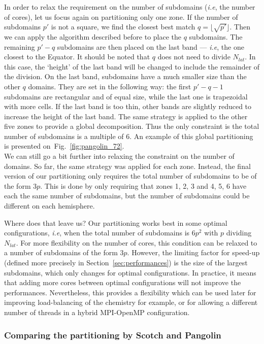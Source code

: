 In order to relax the requirement on the number of subdomains (\textit{i.e}, the
number of cores), let us focus again on partitioning only one zone. If the
number of subdomains $p'$ is not a square, we find the closest best match
$q=\lfloor \sqrt{p'}\rfloor$. Then we can apply the algorithm described before
to place the $q$ subdomains. The remaining $p'-q$ subdomains are then placed on the
last band --- \textit{i.e}, the one closest to the Equator. It should be noted
that $q$ does not need to divide $N_{lat}$. In this case, the `height' of
the last band will be changed to include the remainder of the division.  On the
last band, subdomains have a much smaller size than the other $q$
domains. They are set in the following way: the first $p'-q-1$ subdomains
are rectangular and of equal size, while the last one is trapezoidal with more
cells. If the last band is too thin, other bands are slightly reduced to
increase the height of the last band. The same strategy is applied to the other
five zones to provide a global decomposition. Thus the only constraint is the
total number of subdomains is a multiple of $6$. An example of this global
partitioning is presented on~Fig.~\ref{fig:pangolin_72}.\\
We can still go a bit further into relaxing the constraint on the number of
domains. So far, the same strategy was applied for each zone. Instead, the final
version of our partitioning only requires the total number of subdomains to be of
the form $3p$. This is done by only requiring that zones 1, 2, 3 and 4, 5, 6 have
each the same number of subdomains, but the number of subdomains could be different on
each hemisphere.

Where does that leave us? Our partitioning works best in some optimal
configurations, \textit{i.e}, when the total number of subdomains is $6p^2$ with
$p$ dividing $N_{lat}$. For more flexibility on the number of cores, this
condition can be relaxed to a number of subdomains of the form $3p$. However, the
limiting factor for speed-up (defined more precisely in
Section~\ref{sec:performances}) is the size of the largest subdomains, which only
changes for optimal configurations. In practice, it means that adding more cores
between optimal configurations will not improve the performances. Nevertheless,
this provides a flexibility which can be used later for improving load-balancing
of the chemistry for example, or for allowing a different number of threads in a
hybrid MPI-OpenMP configuration.

\subsubsection{Comparing the partitioning by Scotch and Pangolin}

